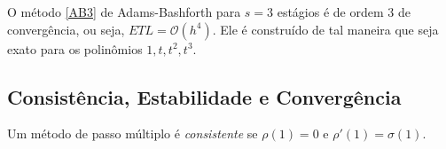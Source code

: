 %
%
%
%
%

\begin{ex}
O método \eqref{AB3} de Adams-Bashforth para $s=3$ estágios é de ordem $3$ de convergência, ou seja, $ETL = \mathcal O(h^4)$. Ele é construído de tal maneira que seja exato para os polinômios $1,t,t^2,t^3$.
\end{ex}




\subsection{Consistência, Estabilidade e Convergência}
\begin{teo}
Um método de passo múltiplo é \emph{consistente} se $\rho (1)=0$ e $\rho '(1)=\sigma (1)$.
\end{teo}


